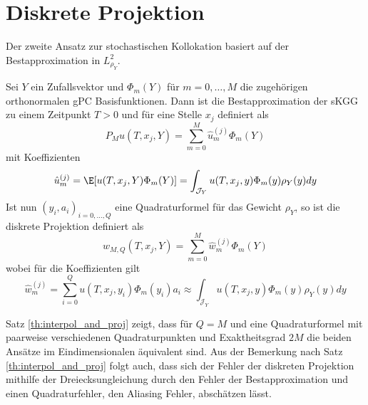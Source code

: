 \section{Diskrete Projektion}
\label{sec:discrete_proj}
Der zweite Ansatz zur stochastischen Kollokation basiert auf der Bestapproximation in $L_{\rho_Y}^2$.
\begin{mathdef}
Sei $Y$ ein Zufallsvektor und $\Phi_m(Y)$ für $m=0,\dots,M$ die zugehörigen orthonormalen gPC Basisfunktionen. Dann ist die Bestapproximation der sKGG zu einem Zeitpunkt $T>0$ und für eine Stelle $x_j$ definiert als
\[P_Mu(T,x_j,Y)=\sum_{m=0}^M\hat{u}_m^{(j)}\Phi_m(Y)\]
mit Koeffizienten
\[\hat{u}_m^{(j)}=\E[u(T,x_j,Y)\Phi_m(Y)]=\int_{\mathcal{J}_Y} u(T,x_j,y)\Phi_m(y)\rho_Y(y)dy\]
Ist nun $(y_i,a_i)_{i=0,\dots,Q}$ eine Quadraturformel für das Gewicht $\rho_Y$, so ist die diskrete Projektion definiert als
\[w_{M,Q}(T,x_j,Y)=\sum_{m=0}^M\hat{w}_m^{(j)}\Phi_m(Y)\] wobei für die Koeffizienten gilt
\[\hat{w}_m^{(j)}=\sum_{i=0}^Qu(T,x_j,y_i)\Phi_m(y_i)a_i\approx \int_{\mathcal{J}_Y} u(T,x_j,y)\Phi_m(y)\rho_Y(y)dy\]
\end{mathdef}
Satz \ref{th:interpol_and_proj} zeigt, dass für $Q=M$ und eine Quadraturformel mit paarweise verschiedenen Quadraturpunkten und Exaktheitsgrad $2M$ die beiden Ansätze im Eindimensionalen äquivalent sind. Aus der Bemerkung nach Satz \ref{th:interpol_and_proj} folgt auch, dass sich der Fehler der diskreten Projektion mithilfe der Dreiecksungleichung durch den Fehler der Bestapproximation und einen Quadraturfehler, den Aliasing Fehler, abschätzen lässt.

